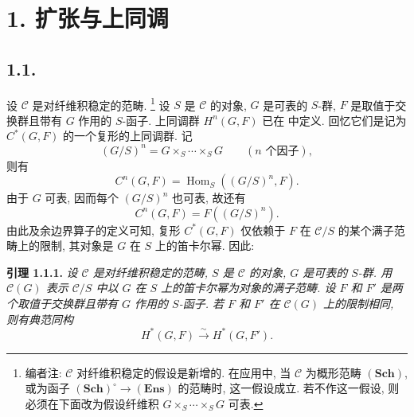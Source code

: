 
\setcounter{footnote}{34}

\section*{1. 扩张与上同调}

\subsection*{1.1.}
设 \(\mathscr C\) 是对纤维积稳定的范畴.
\footnote{编者注: \(\mathscr C\) 对纤维积稳定的假设是新增的.
在应用中, 当 \(\mathscr C\) 为概形范畴
\((\mathbf{Sch})\), 或为函子
\((\mathbf{Sch})^{\circ}\to(\mathbf{Ens})\) 的范畴时, 这一假设成立.
若不作这一假设, 则必须在下面改为假设纤维积
\(G\times_S\cdots\times_S G\) 可表.}
设 \(S\) 是 \(\mathscr C\) 的对象, \(G\) 是可表的
\(S\)-群, \(F\) 是取值于交换群且带有 \(G\) 作用的 \(S\)-函子.
上同调群 \(H^n(G,F)\) 已在  中定义.
回忆它们是记为 \(C^\ast(G,F)\) 的一个复形的上同调群. 记
\[
 (G/S)^n=G\times_S\cdots\times_S G
 \qquad(n\text{ 个因子}),
\]
则有
\[
 C^n(G,F)=\operatorname{Hom}_S((G/S)^n,F).
\]
由于 \(G\) 可表, 因而每个 \((G/S)^n\) 也可表, 故还有
\[
 C^n(G,F)=F((G/S)^n).
\]
由此及余边界算子的定义可知, 复形 \(C^\ast(G,F)\) 仅依赖于
\(F\) 在 \(\mathscr C/S\) 的某个满子范畴上的限制,
其对象是 \(G\) 在 \(S\) 上的笛卡尔幂. 因此:

\medskip
\noindent{}\textbf{引理 1.1.1.}
\textit{设 \(\mathscr C\) 是对纤维积稳定的范畴,
\(S\) 是 \(\mathscr C\) 的对象, \(G\) 是可表的
\(S\)-群. 用 \(\mathscr C(G)\) 表示 \(\mathscr C/S\)
中以 \(G\) 在 \(S\) 上的笛卡尔幂为对象的满子范畴.
设 \(F\) 和 \(F'\) 是两个取值于交换群且带有 \(G\) 作用的
\(S\)-函子. 若 \(F\) 和 \(F'\) 在 \(\mathscr C(G)\)
上的限制相同, 则有典范同构}
\[
 H^\ast(G,F)\xrightarrow{\sim}H^\ast(G,F').
\]

